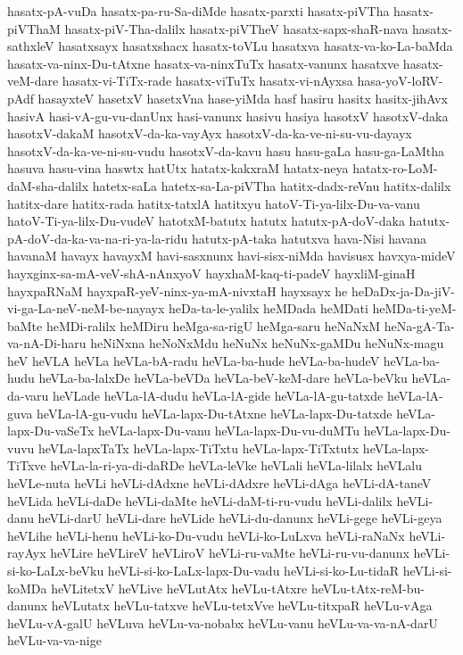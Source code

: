 {hasatx-pA-vuDa
hasatx-pa-ru-Sa-diMde
hasatx-parxti
hasatx-piVTha
hasatx-piVThaM
hasatx-piV-Tha-dalilx
hasatx-piVTheV
hasatx-sapx-shaR-nava
hasatx-sathxleV
hasatxsayx
hasatxshacx
hasatx-toVLu
hasatxva
hasatx-va-ko-La-baMda
hasatx-va-ninx-Du-tAtxne
hasatx-va-ninxTuTx
hasatx-vanunx
hasatxve
hasatx-veM-dare
hasatx-vi-TiTx-rade
hasatx-viTuTx
hasatx-vi-nAyxsa
hasa-yoV-loRV-pAdf
hasayxteV
hasetxV
hasetxVna
hase-yiMda
hasf
hasiru
hasitx
hasitx-jihAvx
hasivA
hasi-vA-gu-vu-danUnx
hasi-vanunx
hasivu
hasiya
hasotxV
hasotxV-daka
hasotxV-dakaM
hasotxV-da-ka-vayAyx
hasotxV-da-ka-ve-ni-su-vu-dayayx
hasotxV-da-ka-ve-ni-su-vudu
hasotxV-da-kavu
hasu
hasu-gaLa
hasu-ga-LaMtha
hasuva
hasu-vina
haswtx
hatUtx
hatatx-kakxraM
hatatx-neya
hatatx-ro-LoM-daM-sha-dalilx
hatetx-saLa
hatetx-sa-La-piVTha
hatitx-dadx-reVnu
hatitx-dalilx
hatitx-dare
hatitx-rada
hatitx-tatxlA
hatitxyu
hatoV-Ti-ya-lilx-Du-va-vanu
hatoV-Ti-ya-lilx-Du-vudeV
hatotxM-batutx
hatutx
hatutx-pA-doV-daka
hatutx-pA-doV-da-ka-va-na-ri-ya-la-ridu
hatutx-pA-taka
hatutxva
hava-Nisi
havana
havanaM
havayx
havayxM
havi-sasxnunx
havi-sisx-niMda
havisusx
havxya-mideV
hayxginx-sa-mA-veV-shA-nAnxyoV
hayxhaM-kaq-ti-padeV
hayxliM-ginaH
hayxpaRNaM
hayxpaR-yeV-ninx-ya-mA-nivxtaH
hayxsayx
he
heDaDx-ja-Da-jiV-vi-ga-La-neV-neM-be-nayayx
heDa-ta-le-yalilx
heMDada
heMDati
heMDa-ti-yeM-baMte
heMDi-ralilx
heMDiru
heMga-sa-rigU
heMga-saru
heNaNxM
heNa-gA-Ta-va-nA-Di-haru
heNiNxna
heNoNxMdu
heNuNx
heNuNx-gaMDu
heNuNx-magu
heV
heVLA
heVLa
heVLa-bA-radu
heVLa-ba-hude
heVLa-ba-hudeV
heVLa-ba-hudu
heVLa-ba-lalxDe
heVLa-beVDa
heVLa-beV-keM-dare
heVLa-beVku
heVLa-da-varu
heVLade
heVLa-lA-dudu
heVLa-lA-gide
heVLa-lA-gu-tatxde
heVLa-lA-guva
heVLa-lA-gu-vudu
heVLa-lapx-Du-tAtxne
heVLa-lapx-Du-tatxde
heVLa-lapx-Du-vaSeTx
heVLa-lapx-Du-vanu
heVLa-lapx-Du-vu-duMTu
heVLa-lapx-Du-vuvu
heVLa-lapxTaTx
heVLa-lapx-TiTxtu
heVLa-lapx-TiTxtutx
heVLa-lapx-TiTxve
heVLa-la-ri-ya-di-daRDe
heVLa-leVke
heVLali
heVLa-lilalx
heVLalu
heVLe-nuta
heVLi
heVLi-dAdxne
heVLi-dAdxre
heVLi-dAga
heVLi-dA-taneV
heVLida
heVLi-daDe
heVLi-daMte
heVLi-daM-ti-ru-vudu
heVLi-dalilx
heVLi-danu
heVLi-darU
heVLi-dare
heVLide
heVLi-du-danunx
heVLi-gege
heVLi-geya
heVLihe
heVLi-henu
heVLi-ko-Du-vudu
heVLi-ko-LuLxva
heVLi-raNaNx
heVLi-rayAyx
heVLire
heVLireV
heVLiroV
heVLi-ru-vaMte
heVLi-ru-vu-danunx
heVLi-si-ko-LaLx-beVku
heVLi-si-ko-LaLx-lapx-Du-vadu
heVLi-si-ko-Lu-tidaR
heVLi-si-koMDa
heVLitetxV
heVLive
heVLutAtx
heVLu-tAtxre
heVLu-tAtx-reM-bu-danunx
heVLutatx
heVLu-tatxve
heVLu-tetxVve
heVLu-titxpaR
heVLu-vAga
heVLu-vA-galU
heVLuva
heVLu-va-nobabx
heVLu-vanu
heVLu-va-va-nA-darU
heVLu-va-va-nige
}
